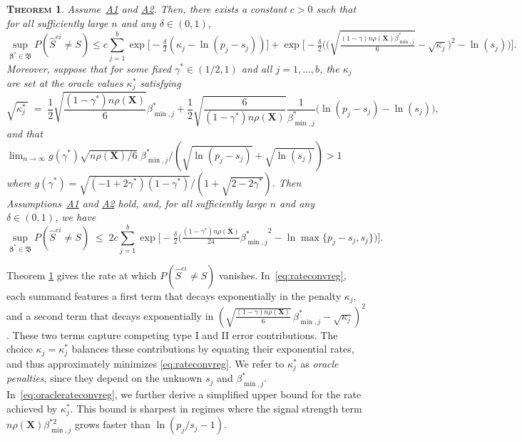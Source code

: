 \documentclass[
  12pt]{article}
\newcommand{\bbeta}{\boldsymbol{\beta}}
\newcommand{\bX}{\mathbf{X}}
\newtheorem{thm}{\textsc{Theorem}}[section]
\begin{document}
\begin{thm}\label{prop:fullrecovreg}
Assume~\hyperlink{lab:A1}{A1} and \hyperlink{lab:A2}{A2}.
Then, there exists a constant $c>0$ such that for all sufficiently large $n$ and any $\delta \in (0,1)$,
\begin{equation}\label{eq:rateconvreg}
\sup_{\bbeta^*\in\mathfrak{B}}P(\hat{S}^{ei} \neq S)\leq c\sum_{j=1}^b\exp\big[-\tfrac{\delta}{2}(\kappa_j-\ln(p_j-s_j))\big] + 
   \exp\Big[- \tfrac{\delta}{2}\Big(\Big(\sqrt{\tfrac{(1-\gamma) n\rho(\bX)\beta_{\min,j}^*}{6}} - \sqrt{\kappa_j}\Big)^2 -\ln(s_j)\Big) \Big].
\end{equation}
Moreover, suppose that for some fixed $\gamma^*\in(1/2,1)$ and all $j=1,\ldots,b$, the $\kappa_j$ are set at the oracle values $\kappa^*_j$ satisfying
	\begin{equation} \label{eq:oraclepenreg}
\sqrt{\kappa^*_j\,} \;=\; \frac12\sqrt{\frac{(1-\gamma^*) n\rho(\bX)}{6}}{\beta_{\min,j}^*}+\frac12\sqrt{\frac{6}{(1-\gamma^*) n\rho(\bX)}}\frac{1}{\beta_{\min,j}^*}\big(\ln({p_j-s_j})-\ln({s_j})\big),
\end{equation}
and that $\lim_{n\to \infty}g(\gamma^*)\sqrt{ n\rho(\bX)/6}\;\beta_{\min,j}^* /(\sqrt{\ln(p_j-s_j)} + \sqrt{\ln(s_j)}) >1$ where $g(\gamma^*)=\sqrt{(-1 + 2 \gamma^*)(1-\gamma^*)}/(1 + \sqrt{2 - 2 \gamma^*})$.
Then Assumptions~\hyperlink{lab:A1}{A1} and \hyperlink{lab:A2}{A2} hold, and, for all sufficiently large $n$ and any $\delta \in (0,1)$, we have
\begin{equation}\label{eq:oraclerateconvreg}
\sup_{\bbeta^*\in\mathfrak{B}}P(\hat{S}^{ei} \neq S) \; \leq \; 2c \sum_{j=1}^b \exp\big[-\tfrac{\delta}{2}\big(\tfrac{(1-\gamma^*) n\rho(\bX)}{24}{\beta_{\min,j}^*}^2-\ln \max\{p_j-s_j,s_j\}\big)\big].
\end{equation}
\end{thm}

Theorem \ref{prop:fullrecovreg} gives the rate at which $P(\hat{S}^{ei} \neq S)$ vanishes.
In~\eqref{eq:rateconvreg}, each summand features a 
first term that decays exponentially in the penalty $\kappa_j$, and a second term that decays exponentially in 
$
(\sqrt{\tfrac{(1-\gamma)n\rho(\bX)}{6}}\,\beta_{\min,j}^* - \sqrt{\kappa_j})^2
$. These two terms capture competing type I and II error contributions.
The choice $\kappa_j=\kappa_j^*$ balances these contributions by equating their exponential rates, and thus approximately minimizes \eqref{eq:rateconvreg}.
We refer to $\kappa_j^*$ as \emph{oracle penalties}, since they depend on the unknown $s_j$ and $\beta_{\min,j}^*$. In~\eqref{eq:oraclerateconvreg}, we further derive a simplified upper bound for the rate achieved by $\kappa_j^*$.
This bound is sharpest in regimes where the signal strength term $n\rho(\bX)\beta_{\min,j}^{*2}$ grows faster than $\ln(p_j/s_j-1)$.
\end{document}
